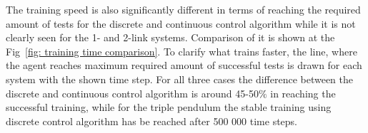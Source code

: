 The training speed is also significantly different in terms of reaching the required amount of tests for the discrete and continuous control algorithm while it is not clearly seen for the 1- and 2-link systems. Comparison of it is shown at the Fig~\ref{fig: training time comparison}. To clarify what trains faster, the line, where the agent reaches maximum required amount of successful tests is drawn for each system with the shown time step. For all three cases the difference between the discrete and continuous control algorithm is around 45-50$\%$ in reaching the successful training, while for the triple pendulum the stable training using discrete control algorithm has be reached after 500 000 time steps.  

